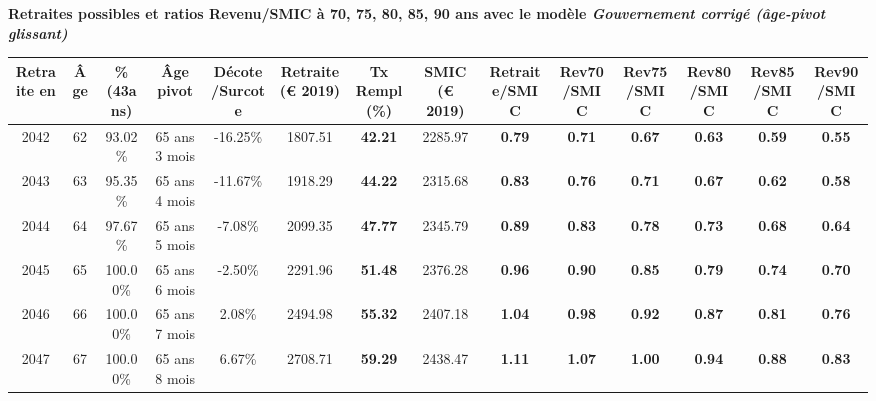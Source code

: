  \vspace{0.1cm} 
{\bf \noindent Retraites possibles et ratios Revenu/SMIC à 70, 75, 80, 85, 90 ans avec le modèle \emph{Gouvernement corrigé (âge-pivot glissant)}}  
 
\begin{adjustbox}{max width=\textwidth} 
\begin{tabular}[htb]{|c|c||c|c|c||c|c||c||c|c|c|c|c|c|} 
\hline 
 Retraite en &  Âge &  \%(43ans) &  Âge pivot &  Décote/Surcote &  Retraite (\euro{} 2019) &  Tx Rempl(\%) &  SMIC (\euro{} 2019) &  Retraite/SMIC &  Rev70/SMIC &  Rev75/SMIC &  Rev80/SMIC &  Rev85/SMIC &  Rev90/SMIC \\ 
\hline \hline 
 2042 &  62 &  93.02\% &  65 ans 3 mois &  -16.25\% &  1807.51 &  {\bf 42.21} &  2285.97 &  {\bf {\color{red} 0.79}} &  {\bf {\color{red} 0.71}} &  {\bf {\color{red} 0.67}} &  {\bf {\color{red} 0.63}} &  {\bf {\color{red} 0.59}} &  {\bf {\color{red} 0.55}} \\ 
\hline 
 2043 &  63 &  95.35\% &  65 ans 4 mois &  -11.67\% &  1918.29 &  {\bf 44.22} &  2315.68 &  {\bf {\color{red} 0.83}} &  {\bf {\color{red} 0.76}} &  {\bf {\color{red} 0.71}} &  {\bf {\color{red} 0.67}} &  {\bf {\color{red} 0.62}} &  {\bf {\color{red} 0.58}} \\ 
\hline 
 2044 &  64 &  97.67\% &  65 ans 5 mois &  -7.08\% &  2099.35 &  {\bf 47.77} &  2345.79 &  {\bf {\color{red} 0.89}} &  {\bf {\color{red} 0.83}} &  {\bf {\color{red} 0.78}} &  {\bf {\color{red} 0.73}} &  {\bf {\color{red} 0.68}} &  {\bf {\color{red} 0.64}} \\ 
\hline 
 2045 &  65 &  100.00\% &  65 ans 6 mois &  -2.50\% &  2291.96 &  {\bf 51.48} &  2376.28 &  {\bf {\color{red} 0.96}} &  {\bf {\color{red} 0.90}} &  {\bf {\color{red} 0.85}} &  {\bf {\color{red} 0.79}} &  {\bf {\color{red} 0.74}} &  {\bf {\color{red} 0.70}} \\ 
\hline 
 2046 &  66 &  100.00\% &  65 ans 7 mois &  2.08\% &  2494.98 &  {\bf 55.32} &  2407.18 &  {\bf 1.04} &  {\bf {\color{red} 0.98}} &  {\bf {\color{red} 0.92}} &  {\bf {\color{red} 0.87}} &  {\bf {\color{red} 0.81}} &  {\bf {\color{red} 0.76}} \\ 
\hline 
 2047 &  67 &  100.00\% &  65 ans 8 mois &  6.67\% &  2708.71 &  {\bf 59.29} &  2438.47 &  {\bf 1.11} &  {\bf 1.07} &  {\bf 1.00} &  {\bf {\color{red} 0.94}} &  {\bf {\color{red} 0.88}} &  {\bf {\color{red} 0.83}} \\ 
\hline 
\hline 
\end{tabular} 
\end{adjustbox} 
 
